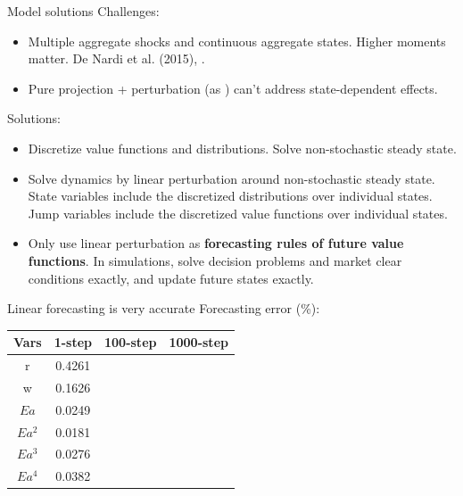 \documentclass[svgnames]{beamer}
\begin{document}
\begin{frame}{Model solutions}
Challenges:
\begin{itemize}
\item Multiple aggregate shocks and continuous aggregate states. Higher moments matter. De Nardi et al. (2015), \citet{bachmann_welfare_2013}.
\item Pure projection + perturbation (as \citet{reiter_solving_2009}) can't address state-dependent effects.
\end{itemize}
Solutions:
\begin{itemize}
\item Discretize value functions and distributions. Solve non-stochastic steady state.
\item Solve dynamics by linear perturbation around non-stochastic steady state. State variables include the discretized distributions over individual states. Jump variables include the discretized value functions over individual states.
\item Only use linear perturbation as {\bf forecasting rules of future value functions}. In simulations, solve decision problems and market clear conditions exactly, and update future states exactly.
\end{itemize}
\end{frame}

\begin{frame}{Linear forecasting is very accurate}
Forecasting error (\%):
\begin{table}
\begin{tabular}{cccc}
\hline
Vars & 1-step & 100-step & 1000-step \\
\hline
r & 0.4261 & & \\
w & 0.1626 & & \\
$Ea$ & 0.0249 & &  \\
$Ea^2$ & 0.0181 & & \\
$Ea^3$ & 0.0276 & & \\
$Ea^4$ & 0.0382 & & \\
\hline
\hline
\end{tabular}
\end{table}
\end{frame}

\end{document}
